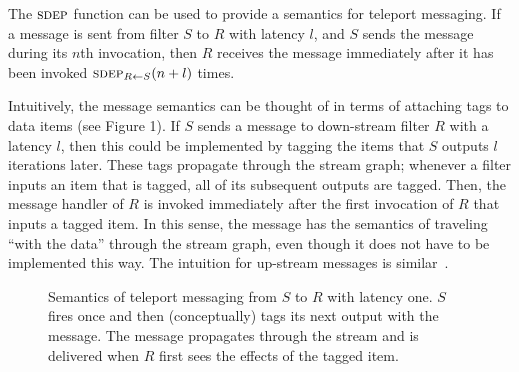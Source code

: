 \documentclass{csailabstractbook}
\begin{document}
The $\textsc{sdep}$ function can be used to provide a semantics for
teleport messaging.  If a message is sent from filter $S$ to $R$ with
latency $l$, and $S$ sends the message during its $n$th invocation,
then $R$ receives the message immediately after it has been invoked
$\textsc{sdep}_{R \small{\leftarrow} S}(n+l)$ times.

Intuitively, the message semantics can be thought of in terms of
attaching tags to data items (see Figure 1). If $S$ sends a message to
down-stream filter $R$ with a latency $l$, then this could be
implemented by tagging the items that $S$ outputs $l$ iterations
later. These tags propagate through the stream graph; whenever a
filter inputs an item that is tagged, all of its subsequent outputs
are tagged.  Then, the message handler of $R$ is invoked immediately
after the first invocation of $R$ that inputs a tagged item. In this
sense, the message has the semantics of traveling ``with the data''
through the stream graph, even though it does not have to be
implemented this way.  The intuition for up-stream messages is
similar~\cite{sdep04}.


\begin{figure}[t]
  \begin{center}
  \end{center}
  \vspace{-30pt}
  \caption{Semantics of teleport messaging from $S$ to $R$ with
  latency one.  $S$ fires once and then (conceptually) tags its next
  output with the message.  The message propagates through the stream
  and is delivered when $R$ first sees the effects of the tagged
  item.}

  \vspace{-12pt}
\end{figure}
\end{document}
